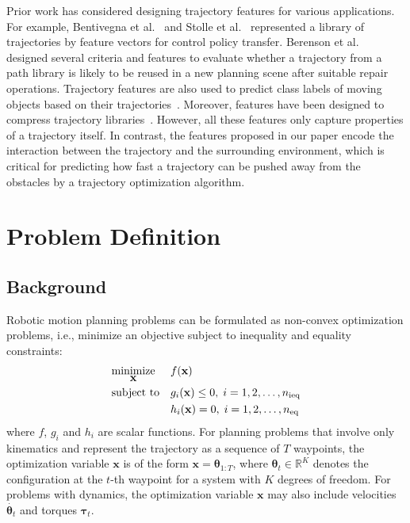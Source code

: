 \documentclass[letterpaper, 10 pt, conference]{ieeeconf}  %
\newcommand{\x}{\mbox{$\mathbf x$}}
\newcommand{\btheta}{\mbox{$\bm \theta$}}
\begin{document}
Prior work has considered designing trajectory features for various applications. For example, Bentivegna et al.~\cite{Bentivegna:2006:LST} and Stolle et al.~\cite{Stolle:2007:TPT} represented a library of trajectories by feature vectors for control policy transfer. 
Berenson et al.~\cite{Berenson:2012:RPP} designed several criteria and features to evaluate whether a trajectory from a path library is likely to be reused in a new planning scene after suitable repair operations. Trajectory features are also used to predict class labels of moving objects based on their trajectories~\cite{Lee:2008:TTC}. Moreover, features have been designed to compress trajectory libraries~\cite{Arikan:2006:CMC}. However, all these features only capture properties of a trajectory itself. In contrast, the features proposed in our paper encode the interaction between the trajectory and the surrounding environment, which is critical for predicting how fast a trajectory can be pushed away from the obstacles by a trajectory optimization algorithm.


\section{Problem Definition}
\label{sec:probstatement}

\subsection{Background}
Robotic motion planning problems can be formulated as non-convex optimization problems, i.e., minimize an objective subject to inequality and equality constraints:
\begin{align}
\label{eq:opt}
& \underset{\x}{\text{minimize}}
& & f(\x) \\
& \text{subject to}
& & g_i(\x) \leq 0, \; i = 1, 2, \dots, n_{\text{ieq}} \notag \\
&&& h_i(\x) = 0, \; i = 1, 2, \dots, n_{\text{eq}} \notag
\end{align}
where $f$, $g_i$ and $h_i$ are scalar functions. For planning problems that involve only kinematics and represent the trajectory as a sequence of $T$ waypoints, the optimization variable $\x$ is of the form $\x = \btheta_{1:T}$, where $\btheta_t \in \mathbb{R}^K$ denotes the configuration at the $t$-th waypoint for a system with $K$ degrees of freedom. For problems with dynamics, the optimization variable $\x$ may also include velocities $\dot{\btheta_t}$ and torques ${\bm \tau}_t$.
\end{document}
